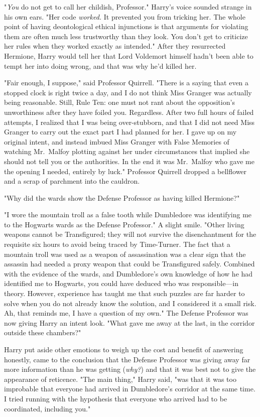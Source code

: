 "\emph{You} do not get to call her childish, Professor." Harry's voice sounded
strange in his own ears. "Her code \emph{worked.} It prevented you from
tricking her. The whole point of having deontological ethical injunctions is
that arguments for violating them are often much less trustworthy than they
look. You don't get to criticize her rules when they worked exactly as
intended." After they resurrected Hermione, Harry would tell her that Lord
Voldemort himself hadn't been able to tempt her into doing wrong, and that was
why he'd killed her.

"Fair enough, I suppose," said Professor Quirrell. "There is a saying that even
a stopped clock is right twice a day, and I do not think Miss Granger was
actually being reasonable. Still, Rule Ten: one must not rant about the
opposition's unworthiness after they have foiled you. Regardless. After two
full hours of failed attempts, I realized that I was being over-stubborn, and
that I did not need Miss Granger to carry out the exact part I had planned for
her. I gave up on my original intent, and instead imbued Miss Granger with
False Memories of watching Mr.~Malfoy plotting against her under circumstances
that implied she should not tell you or the authorities. In the end it was
Mr.~Malfoy who gave me the opening I needed, entirely by luck." Professor
Quirrell dropped a bellflower and a scrap of parchment into the cauldron.

"Why did the wards show the Defense Professor as having killed Hermione?"

"I wore the mountain troll as a false tooth while Dumbledore was identifying me
to the Hogwarts wards as the Defense Professor." A slight smile. "Other living
weapons cannot be Transfigured; they will not survive the disenchantment for
the requisite six hours to avoid being traced by Time-Turner. The fact that a
mountain troll was used as a weapon of assassination was a clear sign that the
assassin had needed a proxy weapon that could be Transfigured safely. Combined
with the evidence of the wards, and Dumbledore's own knowledge of how he had
identified me to Hogwarts, you could have deduced who was responsible---in
theory. However, experience has taught me that such puzzles are far harder to
solve when you do not already know the solution, and I considered it a small
risk. Ah, that reminds me, I have a question of my own." The Defense Professor
was now giving Harry an intent look. "What gave me away at the last, in the
corridor outside these chambers?"

Harry put aside other emotions to weigh up the cost and benefit of answering
honestly, came to the conclusion that the Defense Professor was giving away far
more information than he was getting (\emph{why?}) and that it was best not to
give the appearance of reticence. "The main thing," Harry said, "was that it
was too improbable that everyone had arrived in Dumbledore's corridor at the
same time. I tried running with the hypothesis that everyone who arrived had to
be coordinated, including you."

